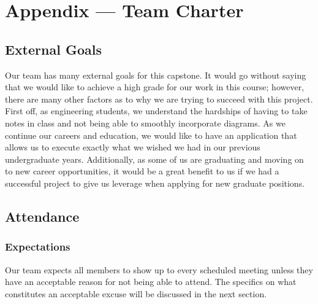 \documentclass{article}
\begin{document}
\newpage{}

\section*{Appendix --- Team Charter}


\subsection*{External Goals}


Our team has many external goals for this capstone. It would go without saying that we would like to achieve a high grade for our work in this course; however, there are many other factors as to why we are trying to succeed with this project. First off, as engineering students, we understand the hardships of having to take notes in class and not being able to smoothly incorporate diagrams. As we continue our careers and education, we would like to have an application that allows us to execute exactly what we wished we had in our previous undergraduate years.
Additionally, as some of us are graduating and moving on to new career opportunities, it would be a great benefit to us if we had a successful project to give us leverage when applying for new graduate positions. 


\subsection*{Attendance}

\subsubsection*{Expectations}


Our team expects all members to show up to every scheduled meeting unless they have an acceptable reason for not being able to attend. The specifics on what constitutes an acceptable excuse will be discussed in the next section.
\end{document}
